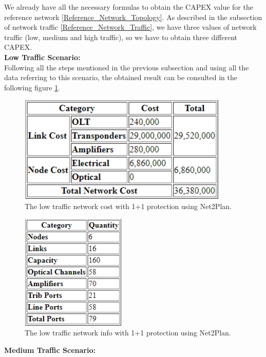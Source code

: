 We already have all the necessary formulas to obtain the CAPEX value for the reference network \ref{Reference_Network_Topology}. As described in the subsection of network traffic \ref{Reference_Network_Traffic}, we have three values of network traffic (low, medium and high traffic), so we have to obtain three different CAPEX.\\

\textbf{Low Traffic Scenario:}\\

Following all the steps mentioned in the previous subsection and using all the data referring to this scenario, the obtained result can be consulted in the following figure \ref{Low_Network_Cost_Protec_Opaque}.

\begin{figure}[h!]
\centering
\includegraphics[width=10cm]{sdf/heuristic/figures/Low_Network_Cost_Protec_Opaque}
\caption{The low traffic network cost with 1+1 protection using Net2Plan.}
\label{Low_Network_Cost_Protec_Opaque}
\end{figure}

\begin{figure}[h!]
\centering
\includegraphics[width=5cm]{sdf/heuristic/figures/Low_Network_Info_Protec_Opaque}
\caption{The low traffic network info with 1+1 protection using Net2Plan.}
\label{Low_Network_Info_Protec_Opaque}
\end{figure}

\newpage
\textbf{Medium Traffic Scenario:}\\

